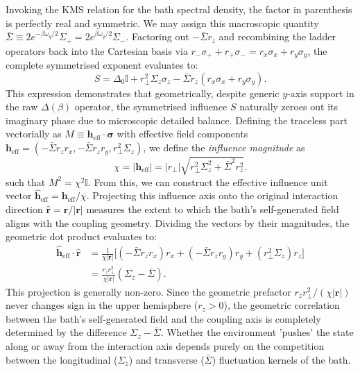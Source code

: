 Invoking the KMS relation for the bath spectral density, the factor in parenthesis is perfectly real and symmetric. We may assign this macroscopic quantity $\bar{\Sigma} \equiv 2 e^{-\beta\omega_q/2}\Sigma_+ = 2 e^{\beta\omega_q/2}\Sigma_-$. Factoring out $-\bar{\Sigma}r_z$ and recombining the ladder operators back into the Cartesian basis via $r_- \sigma_+ + r_+ \sigma_- = r_x\sigma_x + r_y\sigma_y$, the complete symmetrised exponent evaluates to:
\begin{equation}
    S = \Delta_0\mathbb{I} + r_\perp^2 \Sigma_z \sigma_z - \bar{\Sigma} r_z (r_x\sigma_x + r_y\sigma_y).
\end{equation}
This expression demonstrates that geometrically, despite generic $y$-axis support in the raw $\Delta(\beta)$ operator, the symmetrised influence $S$ naturally zeroes out its imaginary phase due to microscopic detailed balance.
Defining the traceless part vectorially as $M \equiv \boldsymbol{h}_{\mathrm{eff}} \cdot \boldsymbol{\sigma}$ with effective field components $\boldsymbol{h}_{\mathrm{eff}} = (- \bar{\Sigma} r_z r_x, - \bar{\Sigma} r_z r_y, r_\perp^2\Sigma_z)$, we define the \emph{influence magnitude} as 
\begin{equation}
\chi = |\boldsymbol{h}_{\mathrm{eff}}| = |r_{\perp}|\sqrt{r_\perp^2\Sigma_z^2 + \bar{\Sigma}^2 r_z^2}.
\end{equation}
such that $M^2 = \chi^2\mathbb{I}$. From this, we can construct the effective influence unit vector $\hat{\boldsymbol{h}}_{\mathrm{eff}} = \boldsymbol{h}_{\mathrm{eff}} / \chi$. Projecting this influence axis onto the original interaction direction $\hat{\boldsymbol{r}} = \boldsymbol{r} / |\boldsymbol{r}|$ measures the extent to which the bath's self-generated field aligns with the coupling geometry. Dividing the vectors by their magnitudes, the geometric dot product evaluates to:
\begin{equation}
    \begin{split}
        \hat{\boldsymbol{h}}_{\mathrm{eff}} \cdot \hat{\boldsymbol{r}} &= \frac{1}{\chi |\boldsymbol{r}|} \Big[ (- \bar{\Sigma} r_z r_x) r_x + (- \bar{\Sigma} r_z r_y) r_y + (r_\perp^2 \Sigma_z) r_z \Big] \\
        &= \frac{r_z r_\perp^2}{\chi |\boldsymbol{r}|} (\Sigma_z - \bar{\Sigma}).
    \end{split}
\end{equation}
This projection is generally non-zero. Since the geometric prefactor $r_z r_\perp^2 / (\chi |\boldsymbol{r}|)$ never changes sign in the upper hemisphere ($r_z > 0$), the geometric correlation between the bath's self-generated field and the coupling axis is completely determined by the difference $\Sigma_z - \bar{\Sigma}$. Whether the environment 'pushes' the state along or away from the interaction axis depends purely on the competition between the longitudinal ($\Sigma_z$) and transverse ($\bar{\Sigma}$) fluctuation kernels of the bath. 


